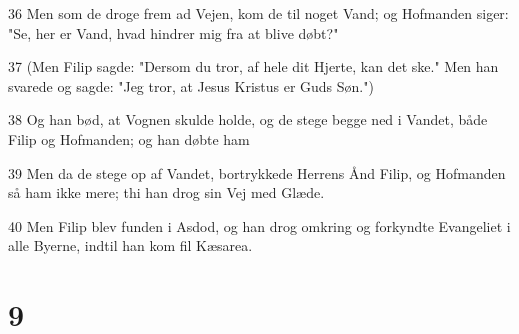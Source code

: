 \par 36 Men som de droge frem ad Vejen, kom de til noget Vand; og Hofmanden siger: "Se, her er Vand, hvad hindrer mig fra at blive døbt?"
\par 37 (Men Filip sagde: "Dersom du tror, af hele dit Hjerte, kan det ske." Men han svarede og sagde: "Jeg tror, at Jesus Kristus er Guds Søn.")
\par 38 Og han bød, at Vognen skulde holde, og de stege begge ned i Vandet, både Filip og Hofmanden; og han døbte ham
\par 39 Men da de stege op af Vandet, bortrykkede Herrens Ånd Filip, og Hofmanden så ham ikke mere; thi han drog sin Vej med Glæde.
\par 40 Men Filip blev funden i Asdod, og han drog omkring og forkyndte Evangeliet i alle Byerne, indtil han kom fil Kæsarea.

\chapter{9}

